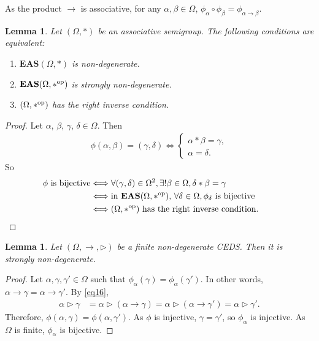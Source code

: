 \documentclass[pdftex]{sigma}
\numberwithin{equation}{section}
\newtheorem{Lemma}[Theorem]{Lemma}
\newcommand{\eas}{\mathbf{EAS}}
\begin{document}
\begin{Remark}
As the product $\rightarrow$ is associative, for any $\alpha,\beta \in \Omega$,
$\phi_\alpha \circ \phi_\beta=\phi_{\alpha \rightarrow \beta}$.
\end{Remark}

\begin{Lemma} \label{lem3.3}
Let $(\Omega,*)$ be an associative semigroup. The following conditions are equivalent:
\begin{enumerate}\itemsep=0pt
\item[$(1)$] $\eas(\Omega,*)$ is non-degenerate.
\item[$(2)$] $\eas(\Omega,*^{\rm op})$ is strongly non-degenerate.
\item[$(3)$] $(\Omega,*^{\rm op})$ has the right inverse condition.
\end{enumerate}
\end{Lemma}

\begin{proof}
Let $\alpha$, $\beta$, $\gamma$, $\delta\in \Omega$. Then
\begin{align*}
\phi(\alpha,\beta)=(\gamma,\delta) \Longleftrightarrow \begin{cases}
\alpha*\beta=\gamma,\\
\alpha=\delta.
\end{cases}\end{align*}
So
\begin{align*}
\phi\text{ is bijective}&\Longleftrightarrow\forall (\gamma,\delta)\in \Omega^2,
\exists! \beta \in \Omega, \delta*\beta=\gamma\\
&\Longleftrightarrow \text{in $\eas(\Omega,*^{\rm op})$, }\forall \delta \in \Omega, \phi_{\delta}\text{ is bijective}\\
&\Longleftrightarrow\text{$(\Omega,*^{\rm op})$ has the right inverse condition}. \tag*{\qed}
\end{align*} \renewcommand{\qed}{}\end{proof}


\begin{Lemma}\label{lem3.4}
Let $(\Omega,\rightarrow,\triangleright)$ be a finite non-degenerate CEDS. Then it is strongly non-degenerate.
\end{Lemma}

\begin{proof}
Let $\alpha,\gamma,\gamma' \in \Omega$ such that $\phi_\alpha(\gamma)=\phi_\alpha(\gamma')$. In other words, $\alpha \rightarrow \gamma=\alpha\rightarrow \gamma'$. By \eqref{eq16},
\begin{align*}
\alpha \triangleright\gamma&=\alpha \triangleright (\alpha \rightarrow \gamma)=\alpha \triangleright (\alpha \rightarrow \gamma')=\alpha \triangleright \gamma'.
\end{align*}
Therefore, $\phi(\alpha,\gamma)=\phi(\alpha,\gamma')$. As $\phi$ is injective, $\gamma=\gamma'$, so $\phi_\alpha$ is injective. As $\Omega$ is finite, $\phi_\alpha$ is bijective.
\end{proof}
\end{document}

